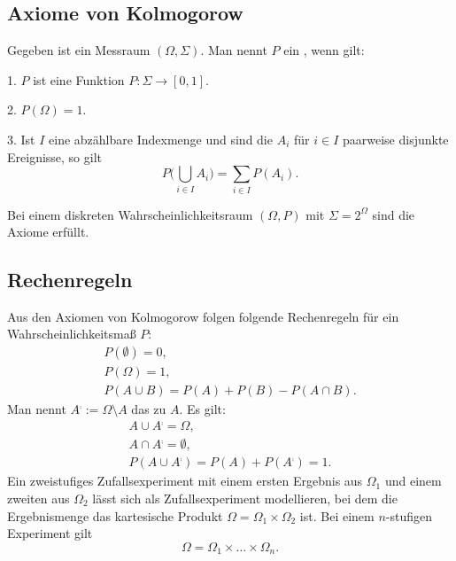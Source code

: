 \subsection{Axiome von Kolmogorow}
\begin{definition}%
%
Gegeben ist ein Messraum $(\Omega,\Sigma)$. Man nennt $P$ ein
, wenn gilt:

1. $P$ ist eine Funktion $P\colon\Sigma\to [0,1]$.

2. $P(\Omega)=1$.

3. Ist $I$ eine abzählbare Indexmenge und sind die $A_i$
für $i\in I$ paarweise disjunkte Ereignisse, so gilt
\begin{equation}
P\Big(\bigcup_{i\in I} A_i\Big) = \sum_{i\in I}P(A_i).
\end{equation}
\end{definition}

\noindent
Bei einem diskreten Wahrscheinlichkeitsraum $(\Omega,P)$ mit
$\Sigma=2^\Omega$ sind die Axiome erfüllt.

\subsection{Rechenregeln}
Aus den Axiomen von Kolmogorow folgen folgende
Rechenregeln für ein Wahrscheinlichkeitsmaß $P$:
\begin{gather}
P(\emptyset) = 0,\\
P(\Omega) = 1,\\
P(A\cup B) = P(A)+P(B)-P(A\cap B).
\end{gather}
Man nennt $A^\comp:=\Omega\setminus A$ das
zu $A$. Es gilt:
\begin{gather}
A\cup A^\comp = \Omega,\\
A\cap A^\comp = \emptyset,\\
P(A\cup A^\comp) = P(A)+P(A^\comp) = 1.
\end{gather}
Ein zweistufiges Zufallsexperiment mit einem ersten Ergebnis aus
$\Omega_1$ und einem zweiten aus $\Omega_2$ lässt sich als
Zufallsexperiment modellieren, bei dem die Ergebnismenge das
kartesische Produkt $\Omega=\Omega_1\times\Omega_2$ ist. Bei einem
$n$-stufigen Experiment gilt
\begin{equation}
\Omega = \Omega_1\times\ldots\times\Omega_n.
\end{equation}

